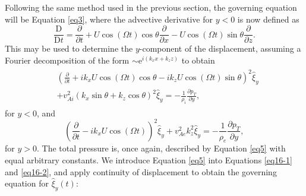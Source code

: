 \documentclass[12pt]{ociamthesis}
\begin{document}
Following the same method used in the previous section, the governing equation will be Equation \eqref{eq3}, where the advective derivative for $y < 0$ is now defined as
\[
\dfrac{\mathrm{D}}{\mathrm{D} t}
= \dfrac{\partial}{\partial t}
+ U \cos(\Omega t) \cos \theta \dfrac{\partial}{\partial x}
- U \cos(\Omega t) \sin \theta \dfrac{\partial}{\partial z}.
\]
This may be used to determine the $y$-component of the displacement, assuming a Fourier decomposition of the form $\sim \mathrm{e}^{i (k_x x + k_z z)}$ to obtain
\begin{align}
\label{eq16-1}
\begin{split}
& \left( \frac{\partial}{\partial t}
+ i k_x U \cos(\Omega t) \cos\theta
- i k_z U \cos(\Omega t) \sin\theta \right)^2 \hat \xi_y
\\[0.3cm]
& + v_{A i}^2 \left( k_x \sin\theta
+ k_z \cos\theta \right)^2 \hat \xi_y
= - \frac{1}{\rho_i} \frac{\partial p_T}{\partial y},
\end{split}
\end{align}
for $y < 0$, and
\begin{equation}
\label{eq16-2}
\left( \frac{\partial}{\partial t}
- i k_x U \cos(\Omega t) \right)^2 \hat \xi_y
+ v_{A e}^2 k_z^2 \hat \xi_y
= - \frac{1}{\rho_e} \frac{\partial p_T}{\partial y},
\end{equation}
for $y > 0$.
The total pressure is, once again, described by Equation \eqref{eq5} with equal arbitrary constants.
We introduce Equation \eqref{eq5} into Equations \eqref{eq16-1} and \eqref{eq16-2}, and apply continuity of displacement to obtain the governing equation for $\hat \xi_y(t)$:
\end{document}

